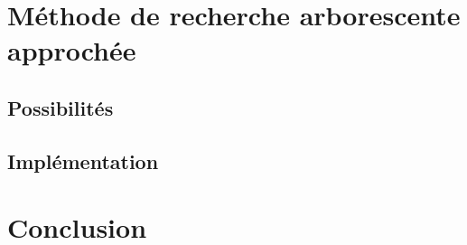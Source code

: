 \documentclass[12pt]{article}
\begin{document}
\section{Méthode de recherche arborescente approchée}

\subsection{Possibilités}


\subsection{Implémentation}



\section{Conclusion}



\end{document}
